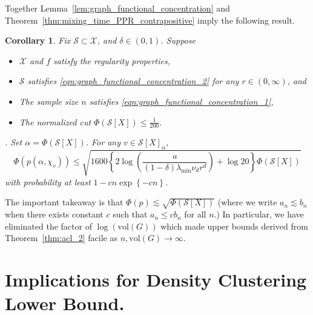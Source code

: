 \documentclass{article}
\newcommand{\vol}{\mathrm{vol}}
\newcommand{\set}[1]{\left\{#1\right\}}
\newcommand{\1}{\mathbf{1}}
\theoremstyle{alden}
\theoremstyle{aldenthm}
\newtheorem{corollary}{Corollary}
\theoremstyle{remark}
\begin{document}
Together Lemma~\ref{lem:graph_functional_concentration} and Theorem~\ref{thm:mixing_time_PPR_contrapositive} imply the following result.
\begin{corollary}
	\label{cor:conductance_ppr_neighborhood_graph}
	Fix $\mathcal{S} \subset \mathcal{X}$, and $\delta \in (0,1)$. Suppose 
	\begin{itemize}
		\item $\mathcal{X}$ and $f$ satisfy the regularity properties,
		\item  $\mathcal{S}$ satisfies \eqref{eqn:graph_functional_concentration_2} for any $r \in (0,\infty)$, and
		\item The sample size $n$ satisfies \eqref{eqn:graph_functional_concentration_1},
		\item The normalized cut $\Phi(\mathcal{S}[X]) \leq \frac{1}{200}$.
	\end{itemize}.
	Set $\alpha = \Phi(\mathcal{S}[X])$. For any $v \in \mathcal{S}[X]_{\alpha}$,
	\begin{equation*}
	\Phi(p(\alpha,\chi_v)) \leq \sqrt{1600\left\{2\log\left(\frac{a}{(1 - \delta)\lambda_{\min}\nu_d r^d}\right) + \log 20\right\} \Phi(\mathcal{S}[X])}
	\end{equation*}
	with probability at least $1 - cn\exp\set{-cn}$. 
\end{corollary}
The important takeaway is that $\Phi(p) \lesssim \sqrt{\Phi(\mathcal{S}[X])}$ (where we write $a_n \lesssim b_n$ when there exists constant $c$ such that $a_n \leq c b_n$ for all $n$.) In particular, we have eliminated the factor of $\log(\vol(G))$ which made upper bounds derived from Theorem~\ref{thm:acl_2} facile as $n,\vol(G) \to \infty$. 

\section{Implications for Density Clustering Lower Bound.}
\end{document}

